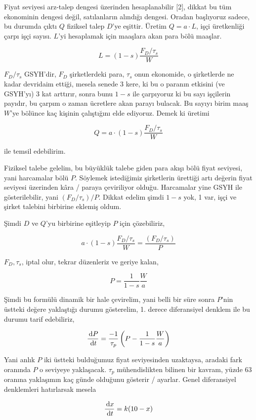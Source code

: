 \documentclass[12pt,fleqn]{article}\usepackage{../../common}
\begin{document}
Fiyat seviyesi arz-talep dengesi üzerinden hesaplanabilir [2], dikkat bu
tüm ekonominin dengesi değil, satılanların alındığı dengesi. Oradan
başlıyoruz sadece, bu durumda çıktı $Q$ fiziksel talep $D$'ye
eşittir. Üretim $Q = a \cdot L$, işçi üretkenliği çarpı işçi sayısı. $L$'yi
hesaplamak için maaşlara akan para bölü maaşlar.

$$ 
L = (1-s) \frac{F_D / \tau_s}{W}
$$

$F_D/\tau_s$ GSYH'dir, $F_D$ şirketlerdeki para, $\tau_s$ onun ekonomide, o
şirketlerde ne kadar devridaim ettiği, mesela senede 3 kere, ki bu o
paranın etkisini (ve GSYH'yı) 3 kat arttırır, sonra bunu $1-s$ ile
çarpıyoruz ki bu sayı işçilerin payıdır, bu çarpım o zaman ücretlere akan
parayı bulacak. Bu sayıyı birim maaş $W$'ye bölünce kaç kişinin çalıştığını
elde ediyoruz. Demek ki üretimi

$$ Q = a \cdot (1-s) \frac{F_D / \tau_s}{W} $$

ile temsil edebilirim. 

Fiziksel talebe gelelim, bu büyüklük talebe giden para akışı bölü fiyat
seviyesi, yani harcamalar bölü $P$. Söylemek istediğimiz şirketlerin
ürettiği artı değerin fiyat seviyesi üzerinden kâra / paraya çeviriliyor
olduğu. Harcamalar yine GSYH ile gösterilebilir, yani $(F_D / \tau_s) /
P$. Dikkat edelim şimdi $1-s$ yok, 1 var, işçi ve şirket talebini birbirine
eklemiş oldum.

Şimdi $D$ ve $Q$'yu birbirine eşitleyip $P$ için çözebiliriz,

$$  a \cdot (1-s) \frac{F_D / \tau_s}{W} = \frac{(F_D / \tau_s)}{P} $$

$F_D,\tau_s$, iptal olur, tekrar düzenleriz ve geriye kalan,

$$ P = \frac{1}{1-s} \frac{W}{a}$$

Şimdi bu formülü dinamik bir hale çevirelim, yani belli bir süre sonra
$P$'nin üstteki değere yaklaştığı durumu gösterelim, 1. derece diferansiyel
denklem ile bu durumu tarif edebiliriz,

$$ 
\frac{\,\mathrm{d} P}{\,\mathrm{d} t} = 
\frac{-1}{\tau_p} \left( P - \frac{1}{1-s} \frac{W}{a} \right)
$$
 
Yani anlık $P$ iki üstteki bulduğumuz fiyat seviyesinden uzaktaysa, aradaki
fark oranında $P$ o seviyeye yaklaşacak. $\tau_p$ mühendislikten bilinen
bir kavram, yüzde 63 oranına yaklaşımın kaç günde olduğunu gösterir /
ayarlar. Genel diferansiyel denklemleri hatırlarsak mesela

$$ \frac{\,\mathrm{d} x}{\,\mathrm{d} t} = k(10-x)$$
\end{document}
